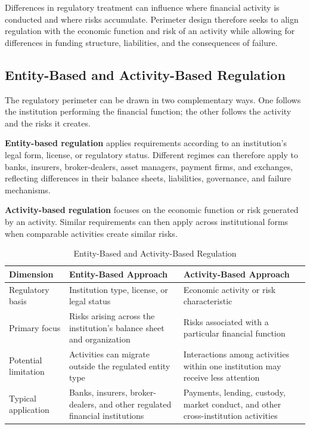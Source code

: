 Differences in regulatory treatment can influence where financial activity is conducted and where risks accumulate. Perimeter design therefore seeks to align regulation with the economic function and risk of an activity while allowing for differences in funding structure, liabilities, and the consequences of failure.

\subsection{Entity-Based and Activity-Based Regulation}

The regulatory perimeter can be drawn in two complementary ways. One follows the institution performing the financial function; the other follows the activity and the risks it creates.

\textbf{Entity-based regulation} applies requirements according to an institution's legal form, license, or regulatory status. Different regimes can therefore apply to banks, insurers, broker-dealers, asset managers, payment firms, and exchanges, reflecting differences in their balance sheets, liabilities, governance, and failure mechanisms.

\textbf{Activity-based regulation} focuses on the economic function or risk generated by an activity. Similar requirements can then apply across institutional forms when comparable activities create similar risks.

\begin{table}[H]

\centering

\caption{Entity-Based and Activity-Based Regulation}

\label{tab:ch23-entity-activity}

\begin{tabularx}{\textwidth}{@{}p{3.5cm}YY@{}}

\toprule

\textbf{Dimension} &
\textbf{Entity-Based Approach} &
\textbf{Activity-Based Approach} \\

\midrule

Regulatory basis &
Institution type, license, or legal status &
Economic activity or risk characteristic \\

Primary focus &
Risks arising across the institution's balance sheet and organization &
Risks associated with a particular financial function \\

Potential limitation &
Activities can migrate outside the regulated entity type &
Interactions among activities within one institution may receive less attention \\

Typical application &
Banks, insurers, broker-dealers, and other regulated financial institutions &
Payments, lending, custody, market conduct, and other cross-institution activities \\

\bottomrule

\end{tabularx}

\end{table}

